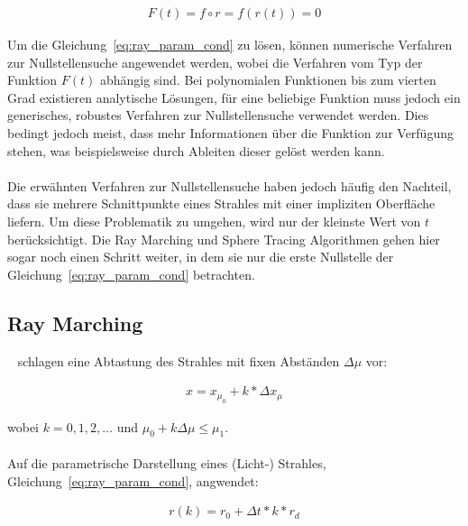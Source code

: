 \begin{gather}\label{eq:ray_param_cond}
    F(t) = f \circ r = f(r(t)) = 0
\end{gather}

Um die Gleichung~\ref{eq:ray_param_cond} zu lösen, können numerische Verfahren
zur Nullstellensuche angewendet werden, wobei die Verfahren vom Typ der
Funktion $F(t)$ abhängig sind. Bei polynomialen Funktionen bis zum vierten Grad
existieren analytische Lösungen, für eine beliebige Funktion muss jedoch ein
generisches, robustes Verfahren zur Nullstellensuche verwendet werden. Dies
bedingt jedoch meist, dass mehr Informationen über die Funktion zur Verfügung
stehen, was beispielsweise durch Ableiten dieser gelöst werden kann.\\
\\
Die erwähnten Verfahren zur Nullstellensuche haben jedoch häufig den Nachteil,
dass sie mehrere Schnittpunkte eines Strahles mit einer impliziten Oberfläche
liefern. Um diese Problematik zu umgehen, wird nur der kleinste Wert von $t$
berücksichtigt. Die Ray Marching und Sphere Tracing Algorithmen gehen hier
sogar noch einen Schritt weiter, in dem sie nur die erste Nullstelle der
Gleichung~\ref{eq:ray_param_cond} betrachten.

\subsection{Ray Marching}
\label{subsec:ray_marching}

~\cite{perlin_hypertexture_1989} schlagen eine Abtastung des Strahles mit fixen
Abständen $\Delta \mu$ vor:

\begin{gather}
    x = x_{\mu_{0}} + k * \Delta x_{\mu}
\end{gather}

wobei $k = 0,1,2,\dots$ und $\mu_{0} + k \Delta \mu \leq \mu_{1}$.\\
\\
Auf die parametrische Darstellung eines (Licht-) Strahles,
Gleichung~\ref{eq:ray_param_cond}, angwendet:

\begin{gather}
    r(k) = r_{0} + \Delta t * k * r_{d}
\end{gather}

